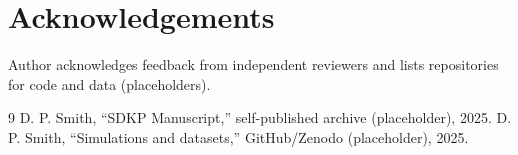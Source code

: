 \documentclass[10pt,twocolumn]{article}
\begin{document}
\section*{Acknowledgements}
Author acknowledges feedback from independent reviewers and lists repositories for code and data (placeholders).


\begin{thebibliography}{9}
 D. P. Smith, ``SDKP Manuscript,'' self-published archive (placeholder), 2025.
 D. P. Smith, ``Simulations and datasets,'' GitHub/Zenodo (placeholder), 2025.
\end{thebibliography}
\end{document}
